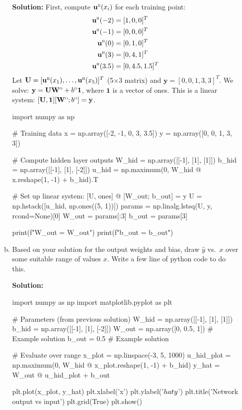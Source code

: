 \documentclass[11pt]{article}
\newcommand{\one}{\mathbf{1}}
\newcommand{\ubf}{\mathbf{u}}
\newcommand{\ybf}{\mathbf{y}}
\newcommand{\Ubf}{\mathbf{U}}
\newcommand{\Wbf}{\mathbf{W}}
\def\hid{\textsc{\tiny H}}
\def\out{\textsc{\tiny O}}
\begin{document}
\begin{enumerate}
\begin{enumerate}[(a)]
\textbf{Solution:}
First, compute $\ubf^\hid(x_i)$ for each training point:
\begin{align*}
\ubf^\hid(-2) &= [1, 0, 0]^T \\
\ubf^\hid(-1) &= [0, 0, 0]^T \\
\ubf^\hid(0) &= [0, 1, 0]^T \\
\ubf^\hid(3) &= [0, 4, 1]^T \\
\ubf^\hid(3.5) &= [0, 4.5, 1.5]^T
\end{align*}
Let $\Ubf = [\ubf^\hid(x_1), \ldots, \ubf^\hid(x_5)]^T$ (5×3 matrix) and $\ybf = [0, 0, 1, 3, 3]^T$.
We solve: $\ybf = \Ubf \Wbf^\out + b^\out \one$, where $\one$ is a vector of ones.
This is a linear system: $[\Ubf, \one] [\Wbf^\out; b^\out] = \ybf$.

\begin{python}
import numpy as np

# Training data
x = np.array([-2, -1, 0, 3, 3.5])
y = np.array([0, 0, 1, 3, 3])

# Compute hidden layer outputs
W_hid = np.array([[-1], [1], [1]])
b_hid = np.array([[-1], [1], [-2]])
u_hid = np.maximum(0, W_hid @ x.reshape(1, -1) + b_hid).T

# Set up linear system: [U, ones] @ [W_out; b_out] = y
U = np.hstack([u_hid, np.ones((5, 1))])
params = np.linalg.lstsq(U, y, rcond=None)[0]
W_out = params[:3]
b_out = params[3]

print(f"W_out = {W_out}")
print(f"b_out = {b_out}")
\end{python}

\item
 Based on your solution for the output weights and bias,
draw $\hat{y}$ vs.\ $x$ over some suitable range of values $x$.  Write a few line of python code to do this.

\textbf{Solution:}
\begin{python}
import numpy as np
import matplotlib.pyplot as plt

# Parameters (from previous solution)
W_hid = np.array([[-1], [1], [1]])
b_hid = np.array([[-1], [1], [-2]])
W_out = np.array([0, 0.5, 1])  # Example solution
b_out = 0.5  # Example solution

# Evaluate over range
x_plot = np.linspace(-3, 5, 1000)
u_hid_plot = np.maximum(0, W_hid @ x_plot.reshape(1, -1) + b_hid)
y_hat = W_out @ u_hid_plot + b_out

plt.plot(x_plot, y_hat)
plt.xlabel('x')
plt.ylabel('$\\hat{y}$')
plt.title('Network output vs input')
plt.grid(True)
plt.show()
\end{python}


\end{enumerate}
\end{enumerate}
\end{document}

